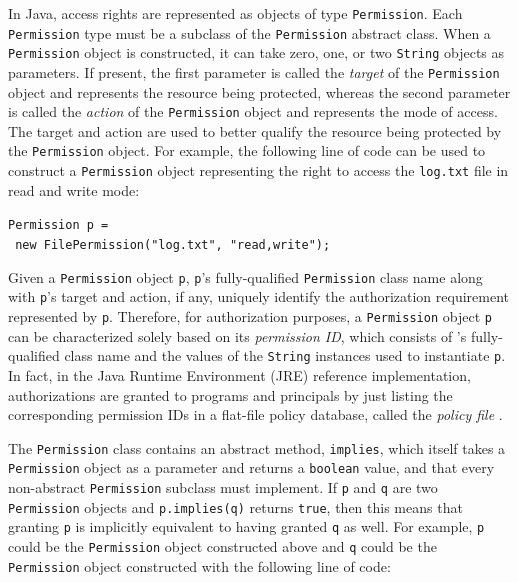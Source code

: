 In Java, access rights are represented as objects of type
\texttt{Permission}. Each \texttt{Permission} type must be a
subclass of the \texttt{Permission} abstract class.  When a
\texttt{Permission} object is constructed, it can take zero, one,
or two \texttt{String} objects as parameters.  If present, the
first parameter is called the \emph{target} of the
\texttt{Permission} object and represents the resource being
protected, whereas the second parameter is called the
\emph{action} of the \texttt{Permission} object and represents the
mode of access. The target and action are used to better qualify
the resource being protected by the \texttt{Permission} object.
For example, the following line of code can be used to construct a
\texttt{Permission} object representing the right to access the
\texttt{log.txt} file in read and write mode:

\begin{tabbing}
	\texttt{Permission p =}\\
	\texttt{   new FilePermission("log.txt",
		"read,write");}
\end{tabbing}

Given a \texttt{Permission} object \texttt{p}, \texttt{p}'s
fully-qualified \texttt{Permission} class name along with
\texttt{p}'s target and action, if any, uniquely identify the
authorization requirement represented by \texttt{p}. Therefore,
for authorization purposes, a \texttt{Permission} object \texttt{p}
can be characterized solely based on its \textit{permission
	ID}, which consists of 's fully-qualified class name and
the values of the \texttt{String} instances used to instantiate
\texttt{p}.  In fact, in the Java Runtime Environment (JRE)
reference implementation, authorizations are granted to programs
and principals by just listing the corresponding permission IDs in
a flat-file policy database, called the \emph{policy file}
\cite{book:J2SESecBook}.

The \texttt{Permission} class contains an abstract method,
\texttt{implies}, which itself takes a \texttt{Permission} object
as a parameter and returns a \texttt{boolean} value, and that
every non-abstract \texttt{Permission} subclass must implement. If
\texttt{p} and \texttt{q} are two \texttt{Permission} objects and
\texttt{p.implies(q)} returns \texttt{true}, then this means that
granting \texttt{p} is implicitly equivalent to having granted
\texttt{q} as well.  For example, \texttt{p} could be the
\texttt{Permission} object constructed above and \texttt{q} could
be the \texttt{Permission} object constructed with the following line of
code:

